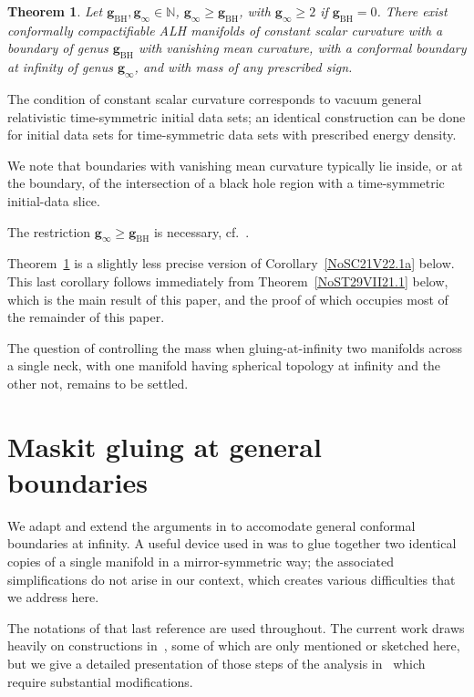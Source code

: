 \documentclass[pdftex]{sigma}
\numberwithin{equation}{section}
\newtheorem{Theorem}{Theorem}[section]
\newcommand{\N}{\mathbb N}
\begin{document}
\begin{Theorem} \label{T7VI22.1}
 Let ${{\mathbf g}_{\mathrm{BH}}}, {{\mathbf g}_\infty} \in \N$, ${{\mathbf g}_\infty} \ge {{\mathbf g}_{\mathrm{BH}}}$, with ${{\mathbf g}_\infty} \ge 2$ if ${{\mathbf g}_{\mathrm{BH}}}=0$.
There exist conformally compactifiable ALH manifolds of constant scalar curvature with a boundary of genus ${{\mathbf g}_{\mathrm{BH}}}$ with vanishing mean curvature, {with a conformal boundary at infinity of genus} ${{\mathbf g}_\infty} $, and with mass of {any} prescribed sign.
\end{Theorem}

The condition of constant scalar curvature corresponds to vacuum general relativistic time-symmetric initial data sets; an identical construction can be done for initial data sets for time-symmetric data sets with prescribed energy density.


We note that boundaries with vanishing mean curvature typically lie inside, or at the boundary, of the intersection of a black hole region with a time-symmetric initial-data slice.

The restriction ${{\mathbf g}_\infty} \ge {{\mathbf g}_{\mathrm{BH}}}$ is necessary, cf.~\cite{GSWW}.

Theorem~\ref{T7VI22.1} is a slightly less precise version of Corollary~\ref{NoSC21V22.1a} below. This last corollary follows immediately from Theorem~\ref{NoST29VII21.1} below, which is the main result of this paper, and the proof of which occupies most of the remainder of this paper.

The question of controlling the mass when gluing-at-infinity two manifolds across a single neck, with one manifold having spherical topology at infinity and the other not, remains to be settled.

\section{Maskit gluing at general boundaries}
\label{NoSs29VII21.1}

We adapt and extend the arguments in \cite{CDW} to accomodate general conformal boundaries at infinity. A useful device used in \cite{CDW} was to glue together two identical copies of a single manifold in a mirror-symmetric way; the associated simplifications do not arise in our context, which creates various difficulties that we address here.

The notations of that last reference are used throughout. {The current work draws heavily on constructions in~\cite{CDW}, some of which are only mentioned or sketched here, but we give a detailed presentation of those steps of the analysis in~\cite{CDW} which require substantial modifications.}
\end{document}
